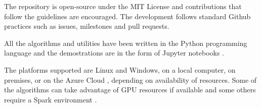 The repository is open-source under the MIT License and contributions that follow the guidelines are encouraged.  
The development follows standard Github practices such as issues, milestones and pull requests.

All the algorithms and utilities have been written in the Python programming language and the demostrations are 
in the form of Jupyter notebooks \cite{jupyter}.

The platforms supported are Linux and Windows, on a local computer, on premises, or on the Azure Cloud \cite{azure}, depending on availability of resources.
Some of the algorithms can take advantage of GPU resources if available and some others require a Spark environment \cite{spark}.
